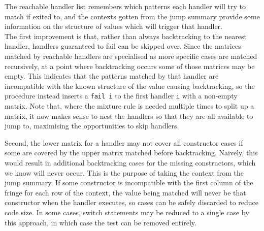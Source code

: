 The reachable handler list remembers which patterns each handler will try to match if exited to, and the contexts gotten from the jump summary provide some information on the structure of values which will trigger that handler. \\
The first improvement is that, rather than always backtracking to the nearest handler, handlers guaranteed to fail can be skipped over. Since the matrices matched by reachable handlers are specialised as more specific cases are matched recursively, at a point where backtracking occurs some of those matrices may be empty. This indicates that the patterns matched by that handler are incompatible with the known structure of the value causing backtracking, so the procedure instead inserts a \verb|fail i| to the first handler \verb|i| with a non-empty matrix. Note that, where the mixture rule is needed multiple times to split up a matrix, it now makes sense to nest the handlers so that they are all available to jump to, maximising the opportunities to skip handlers.  

Second, the lower matrix for a handler may not cover all constructor cases if some are covered by the upper matrix matched before backtracking. Naively, this would result in additional backtracking cases for the missing constructors, which we know will never occur. This is the purpose of taking the context from the jump summary. If some constructor is incompatible with the first column of the fringe for each row of the context, the value being matched will never be that constructor when the handler executes, so cases can be safely discarded to reduce code size. In some cases, switch statements may be reduced to a single case by this approach, in which case the test can be removed entirely.









